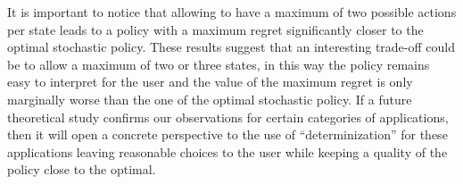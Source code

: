 It is important to notice that allowing to have a maximum of two possible actions per state leads to a policy with a maximum regret significantly closer to the optimal stochastic policy. These results suggest that an interesting trade-off could be to allow a maximum of two or three states, in this way the policy remains easy to interpret for the user and the value of the maximum regret is only marginally worse than the one of the optimal stochastic policy.
If a future theoretical study confirms our observations for certain categories of applications, then it will open a concrete perspective to the use of ``determinization'' for these applications leaving reasonable choices to the user while keeping a quality of the policy close to the optimal.
